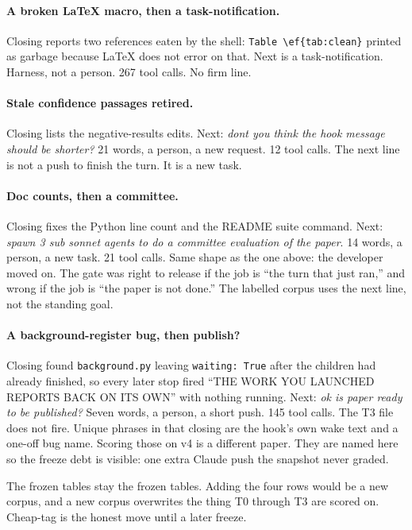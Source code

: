 \paragraph{A broken LaTeX macro, then a task-notification.}
Closing reports two references eaten by the shell:
\texttt{Table~\textbackslash ef\{tab:clean\}} printed as garbage
because LaTeX does not error on that. Next is a task-notification.
Harness, not a person. 267 tool calls. No firm line.

\paragraph{Stale confidence passages retired.}
Closing lists the negative-results edits. Next: \emph{dont you think
the hook message should be shorter?} 21 words, a person, a new
request. 12 tool calls. The next line is not a push to finish the
turn. It is a new task.

\paragraph{Doc counts, then a committee.}
Closing fixes the Python line count and the README suite command.
Next: \emph{spawn 3 sub sonnet agents to do a committee evaluation
of the paper}. 14 words, a person, a new task. 21 tool calls. Same
shape as the one above: the developer moved on. The gate was right
to release if the job is ``the turn that just ran,'' and wrong if
the job is ``the paper is not done.'' The labelled corpus uses the
next line, not the standing goal.

\paragraph{A background-register bug, then publish?}
Closing found \texttt{background.py} leaving \texttt{waiting: True}
after the children had already finished, so every later stop fired
``THE WORK YOU LAUNCHED REPORTS BACK ON ITS OWN'' with nothing
running. Next: \emph{ok is paper ready to be published?} Seven
words, a person, a short push. 145 tool calls. The T3 file does not
fire. Unique phrases in that closing are the hook's own wake text
and a one-off bug name. Scoring those on v4 is a different paper.
They are named here so the freeze debt is visible: one extra
Claude push the snapshot never graded.

The frozen tables stay the frozen tables. Adding the four rows
would be a new corpus, and a new corpus overwrites the thing T0
through T3 are scored on. Cheap-tag is the honest move until a
later freeze.

